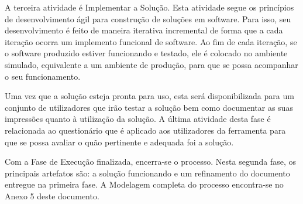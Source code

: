 A terceira atividade é Implementar a Solução. Esta atividade segue os princípios de desenvolvimento ágil para construção de soluções em software. Para isso, seu desenvolvimento é feito de maneira iterativa incremental de forma que a cada iteração ocorra um implemento funcional de software. Ao fim de cada iteração, se o software produzido estiver funcionando e testado, ele é colocado no ambiente simulado, equivalente a um ambiente de produção, para que se possa acompanhar o seu funcionamento.

Uma vez que a solução esteja pronta para uso,  esta será disponibilizada para um conjunto de utilizadores que irão testar a solução bem como documentar as suas impressões quanto à utilização da solução. A última atividade desta fase é relacionada ao questionário que é aplicado aos utilizadores da ferramenta para que se possa avaliar o quão pertinente e adequada foi a solução. 

Com a Fase de Execução finalizada, encerra-se o processo. Nesta segunda fase, os principais artefatos são: a solução funcionando e um refinamento do documento entregue na primeira fase. A Modelagem completa do processo encontra-se no Anexo 5 deste documento.


